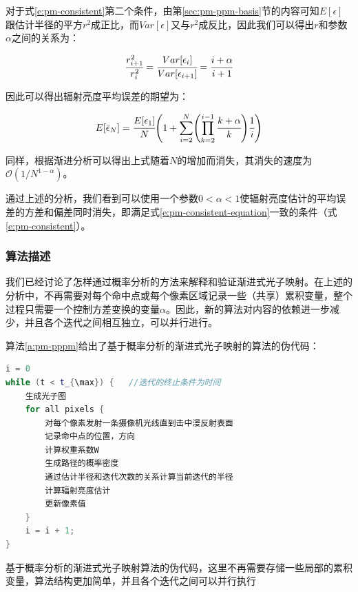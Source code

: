 对于式\ref{e:pm-consistent}第二个条件，由第\ref{sec:pm-ppm-basis}节的内容可知$E[\epsilon]$跟估计半径的平方$r^{2}$成正比，而$Var[\epsilon]$又与$r^{2}$成反比，因此我们可以得出$r$和参数$\alpha$之间的关系为：

\begin{equation}\label{e:pm-pppm-radius}
	 \cfrac{r^{2}_{i+1}}{r^{2}_i}= \cfrac{Var[\epsilon_i]}{Var[\epsilon_{i+1}]}= \cfrac{i+\alpha}{i+1}
\end{equation}

\noindent 因此可以得出辐射亮度平均误差的期望为：

\begin{equation}
	E[\bar{\epsilon}_N]= \cfrac{E[\epsilon_1]}{N}\Biggl( 1+\sum^{N}_{i=2}\Biggl(\prod^{i-1}_{k=2} \cfrac{k+\alpha}{k}\Biggl)  \cfrac{1}{i}\Biggl)
\end{equation}

同样，根据渐进分析可以得出上式随着$N$的增加而消失，其消失的速度为$\mathcal{O}(1/N^{1-\alpha})$。

通过上述的分析，我们看到可以使用一个参数$0<\alpha<1$使辐射亮度估计的平均误差的方差和偏差同时消失，即满足式\ref{e:pm-consistent-equation}一致的条件（式\ref{e:pm-consistent}）。





\subsubsection{算法描述}\label{sec:pm-ppppm-algorithm}
我们已经讨论了怎样通过概率分析的方法来解释和验证渐进式光子映射。在上述的分析中，不再需要对每个命中点或每个像素区域记录一些（共享）累积变量，整个过程只需要一个控制方差变换的变量$\alpha$。因此，新的算法对内容的依赖进一步减少，并且各个迭代之间相互独立，可以并行进行。

算法\ref{a:pm-pppm}给出了基于概率分析的渐进式光子映射的算法的伪代码：

\begin{algorithm}
\begin{lstlisting}[language=C++]
i = 0
while (t < t_{\max}) {   //迭代的终止条件为时间
	生成光子图
	for all pixels {
		对每个像素发射一条摄像机光线直到击中漫反射表面
		记录命中点的位置，方向
		计算权重系数W
		生成路径的概率密度
		通过估计半径和迭代次数的关系计算当前迭代的半径
		计算辐射亮度估计
		更新像素值  
	}
	i = i + 1;
}
\end{lstlisting}	
\caption{基于概率分析的渐进式光子映射算法的伪代码，这里不再需要存储一些局部的累积变量，算法结构更加简单，并且各个迭代之间可以并行执行}
\label{a:pm-pppm}
\end{algorithm}

